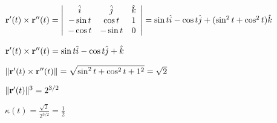 \documentclass[12pt]{article}
\begin{document}
${\bf r}'(t)\times {\bf r}''(t) = \left|
\begin{array}{ccc}
\hat{i} & \hat{j} & \hat{k} \\
-\sin t & \cos t & 1 \\
-\cos t & -\sin t & 0 \\
\end{array}\right| = \sin t\hat{i} - \cos t\hat{j} + (\sin^2 t + \cos^2 t)\hat{k}$


${\bf r}'(t)\times {\bf r}''(t) =  \sin t\hat{i} - \cos t\hat{j} + \hat{k}$

$\Vert {\bf r}'(t)\times {\bf r}''(t) \Vert = \sqrt{\sin^2 t + \cos^2 t + 1^2} = \sqrt{2}$

$\Vert {\bf r}'(t)\Vert^3 = 2^{3/2}$

$\kappa(t) = \frac{\sqrt{2}}{2^{3/2}} = \frac{1}{2}$
\end{document}
